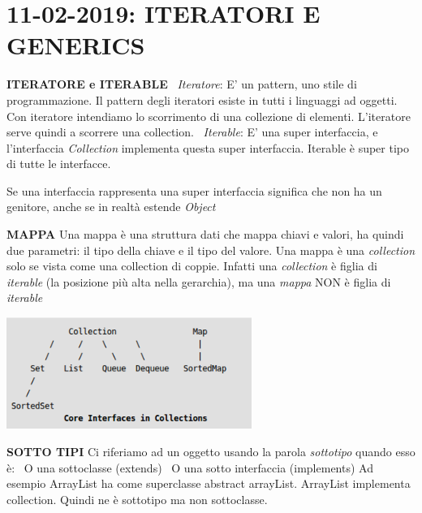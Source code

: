 

\newpage
\section{11-02-2019: ITERATORI E GENERICS}
\noindent \textbf{ITERATORE e ITERABLE}\newline
\textbullet\  \textit{Iteratore}: E' un pattern, uno stile di programmazione. Il pattern degli iteratori esiste in tutti i linguaggi ad oggetti. Con iteratore intendiamo lo scorrimento di una collezione di elementi. L'iteratore serve quindi a scorrere una collection.\newline
\textbullet\ \textit{Iterable}: E' una super interfaccia, e l'interfaccia \textit{Collection} implementa questa super interfaccia. Iterable è super tipo di tutte le interfacce.

\noindent Se una interfaccia rappresenta una super interfaccia significa che non ha un genitore, anche se in realtà estende \textit{Object}


\noindent \textbf{MAPPA}\newline
Una mappa è una struttura dati che mappa chiavi e valori, ha quindi due parametri: il tipo della chiave e il tipo del valore. Una mappa è una \textit{collection} solo se vista come una collection di coppie. Infatti una \textit{collection} è figlia di \textit{iterable} (la posizione più alta nella gerarchia), ma una \textit{mappa} NON è figlia di \textit{iterable}
\begin{center}
\includegraphics[width=%
0.6\textwidth]{MapInterface}
\end{center} 

\noindent \textbf{SOTTO TIPI}\newline
Ci riferiamo ad un oggetto usando la parola \textit{sottotipo} quando esso è:\newline
\textbullet\ O una sottoclasse (extends) \newline
\textbullet\ O una sotto interfaccia (implements) \newline
Ad esempio ArrayList ha come superclasse abstract arrayList. ArrayList implementa collection. Quindi ne è sottotipo ma non sottoclasse.

